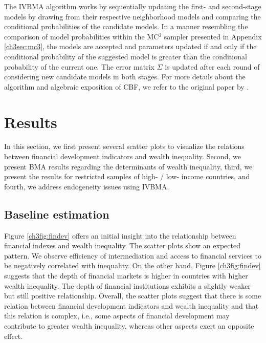 \begin{refsection}
The \ac{IVBMA} algorithm works by sequentially updating the first- and second-stage models by drawing from their respective neighborhood models and comparing the conditional probabilities of the candidate models. In a manner resembling the comparison of model probabilities within the MC$^{3}$ sampler presented in Appendix \ref{ch3sec:mc3}, the models are accepted and parameters updated if and only if the conditional probability of the suggested model is greater than the conditional probability of the current one. The error matrix $\Sigma$ is updated after each round of considering new candidate models in both stages. For more details about the algorithm and algebraic exposition of \ac{CBF}, we refer to the original paper by \textcite{KarlLenkoski2012}.
%
%
%
%
%
\section{Results}
\label{ch3sec:results}
In this section, we first present several scatter plots to visualize the relations between financial development indicators and wealth inequality. Second, we present \ac{BMA} results regarding the determinants of wealth inequality, third, we present the results for restricted samples of high- / low- income countries, and fourth, we address endogeneity issues using \ac{IVBMA}.

\subsection{Baseline estimation}
Figure \ref{ch3fig:findev} offers an initial insight into the relationship between financial indexes and wealth inequality. The scatter plots show an expected pattern.  We observe efficiency of intermediation and access to financial services to be negatively correlated with inequality. On the other hand, Figure \ref{ch3fig:findev} suggests that the depth of financial markets is higher in countries with higher wealth inequality. The depth of financial institutions exhibits a slightly weaker but still positive relationship. Overall, the scatter plots suggest that there is some relation between financial development indicators and wealth inequality and that this relation is complex, i.e., some aspects of financial development may contribute to greater wealth inequality, whereas other aspects exert an opposite effect.


\end{refsection}
